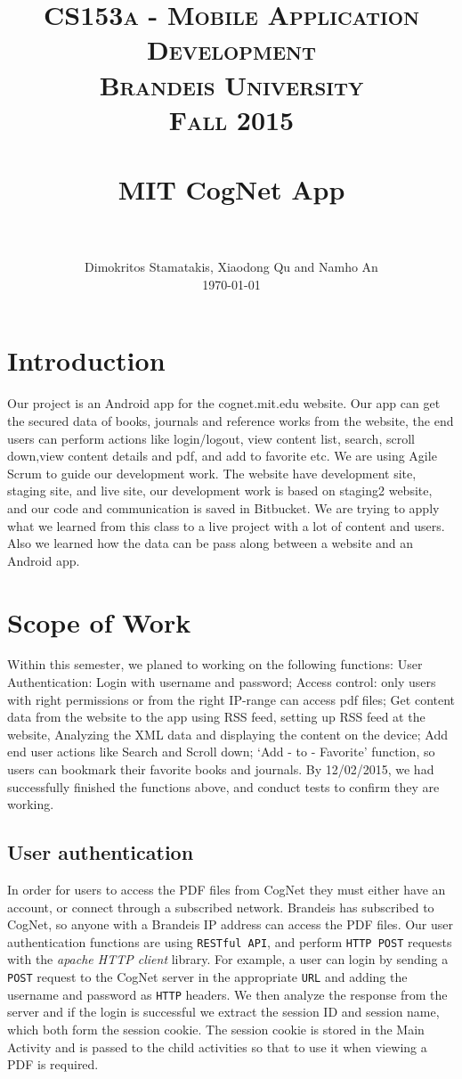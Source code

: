 \documentclass [a4paper, 11pt, oneside, final]{article}
\title{
		\usefont{OT1}{bch}{b}{n}
		\normalfont \Large \textsc{CS153a - Mobile Application Development}\\ \textsc{Brandeis University} \\ \textsc{Fall 2015}  \\[25pt]
		\horrule{0.5pt} \\[0.4cm]
		\huge MIT CogNet App\\
		\horrule{2pt} \\[0.5cm]
}
\author{
		\normalfont 								
	\normalsize
        Dimokritos Stamatakis, Xiaodong Qu and Namho An\\
	\normalsize        
	\today
}
\date{}
\numberwithin{equation}{section}		%
\numberwithin{figure}{section}			%
\numberwithin{table}{section}				%
\begin{document}
\maketitle

\newpage

\section{Introduction}
Our project is an Android app for the cognet.mit.edu website. Our app can get the secured data of books, journals and reference works from the website, the end users can perform actions like login/logout, view content list, search, scroll down,view content details and pdf, and add to favorite etc. We are using Agile Scrum to guide our development work. The website have development site, staging site, and live site, our development work is based on staging2 website, and our code and communication is saved in Bitbucket. We are trying to apply what we learned from this class to a live project with a lot of content and users. Also we learned how the data can be pass along between a website and an Android app.

\section{Scope of Work}
Within this semester, we planed to working on the following functions: User Authentication: Login with username and password; Access control: only users with right permissions or from the right IP-range can access pdf files; Get content data from the website to the app using RSS feed, setting up RSS feed at the website, Analyzing the XML data and displaying the content on the device; Add end user actions like Search and Scroll down; ‘Add - to - Favorite’ function, so users can bookmark their favorite books and journals. By 12/02/2015, we had successfully finished the functions above, and conduct tests to confirm they are working.

\subsection{User authentication}
In order for users to access the PDF files from CogNet they must either have an account, or connect through a subscribed network. Brandeis has subscribed to CogNet, so anyone with a Brandeis IP address can access the PDF files. Our user authentication functions are using {\tt RESTful API}, and perform {\tt HTTP POST} requests with the \textit{apache HTTP client} library. For example, a user can login by sending a {\tt POST} request to the CogNet server in the appropriate {\tt URL} and adding the username and password as {\tt HTTP} headers. We then analyze the response from the server and if the login is successful we extract the session ID and session name, which both form the session cookie. The session cookie is stored in the Main Activity and is passed to the child activities so that to use it when viewing a PDF is required.
\end{document}
